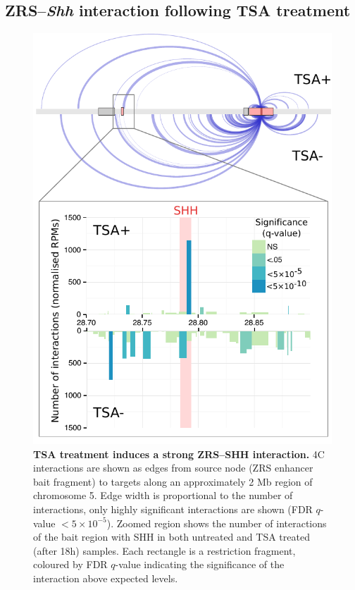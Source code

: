\documentclass[a4paper,11pt,oneside]{book}
\begin{document}

\subsection{ZRS--\emph{Shh} interaction following TSA treatment}

\begin{figure}
\begin{center} 
\includegraphics[width=5in]{figs/shharc_full.pdf}
\captionsetup{width=\textwidth} 
\caption[TSA treatment induces a strong ZRS--SHH interaction. ]{ {\bf TSA treatment induces a strong ZRS--SHH interaction. }
4C interactions are shown as edges from source node (ZRS enhancer bait fragment) to targets along an approximately 2 Mb region of chromosome 5. Edge width is proportional to the number of interactions, only highly significant interactions are shown (FDR $q$-value $<5 \times 10 ^{-5}$). Zoomed region shows the number of interactions of the bait region with SHH in both untreated and TSA treated (after 18h) samples. Each rectangle is a restriction fragment, coloured by FDR $q$-value indicating the significance of the interaction above expected levels.
}\label{fig:ssharc}
\end{center} 
\end{figure} 
\end{document}
